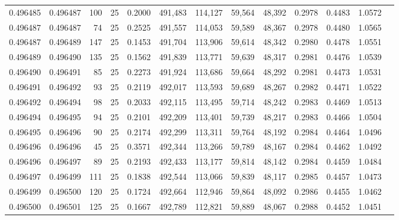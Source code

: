 \begin{tabular}{rrrrrrrrrrrrr}
0.496485 & 0.496487 &   100 &  25 &                                     0.2000 & 491,483 & 114,127 &  59,564 &  48,392 & 0.2978 & 0.4483 & 1.0572 \\
0.496487 & 0.496487 &    74 &  25 &                                     0.2525 & 491,557 & 114,053 &  59,589 &  48,367 & 0.2978 & 0.4480 & 1.0565 \\
0.496487 & 0.496489 &   147 &  25 &                                     0.1453 & 491,704 & 113,906 &  59,614 &  48,342 & 0.2980 & 0.4478 & 1.0551 \\
0.496489 & 0.496490 &   135 &  25 &                                     0.1562 & 491,839 & 113,771 &  59,639 &  48,317 & 0.2981 & 0.4476 & 1.0539 \\
0.496490 & 0.496491 &    85 &  25 &                                     0.2273 & 491,924 & 113,686 &  59,664 &  48,292 & 0.2981 & 0.4473 & 1.0531 \\
0.496491 & 0.496492 &    93 &  25 &                                     0.2119 & 492,017 & 113,593 &  59,689 &  48,267 & 0.2982 & 0.4471 & 1.0522 \\
0.496492 & 0.496494 &    98 &  25 &                                     0.2033 & 492,115 & 113,495 &  59,714 &  48,242 & 0.2983 & 0.4469 & 1.0513 \\
0.496494 & 0.496495 &    94 &  25 &                                     0.2101 & 492,209 & 113,401 &  59,739 &  48,217 & 0.2983 & 0.4466 & 1.0504 \\
0.496495 & 0.496496 &    90 &  25 &                                     0.2174 & 492,299 & 113,311 &  59,764 &  48,192 & 0.2984 & 0.4464 & 1.0496 \\
0.496496 & 0.496496 &    45 &  25 &                                     0.3571 & 492,344 & 113,266 &  59,789 &  48,167 & 0.2984 & 0.4462 & 1.0492 \\
0.496496 & 0.496497 &    89 &  25 &                                     0.2193 & 492,433 & 113,177 &  59,814 &  48,142 & 0.2984 & 0.4459 & 1.0484 \\
0.496497 & 0.496499 &   111 &  25 &                                     0.1838 & 492,544 & 113,066 &  59,839 &  48,117 & 0.2985 & 0.4457 & 1.0473 \\
0.496499 & 0.496500 &   120 &  25 &                                     0.1724 & 492,664 & 112,946 &  59,864 &  48,092 & 0.2986 & 0.4455 & 1.0462 \\
0.496500 & 0.496501 &   125 &  25 &                                     0.1667 & 492,789 & 112,821 &  59,889 &  48,067 & 0.2988 & 0.4452 & 1.0451 \\

\end{tabular}
